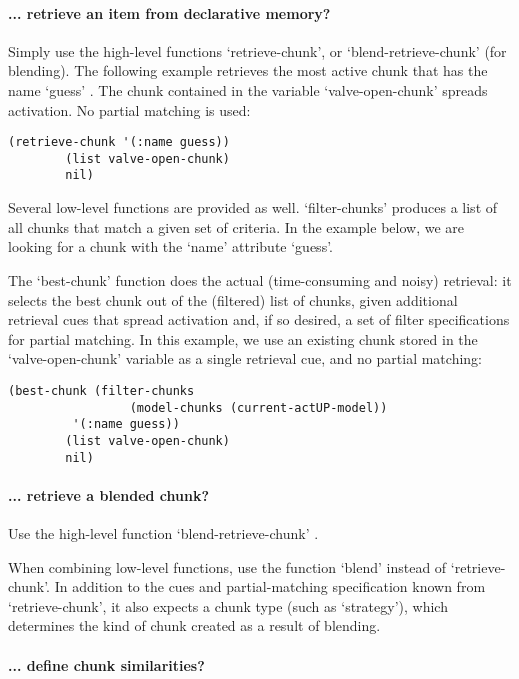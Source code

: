 \documentclass{article}
\begin{document}
\paragraph {... retrieve an item from declarative memory?}

Simply use the high-level functions `retrieve-chunk', or `blend-retrieve-chunk' (for blending).  The following example retrieves the most active chunk that has the name `guess' .  The chunk contained in the variable `valve-open-chunk' 
spreads activation.  No partial matching is used:

\begin{verbatim}
(retrieve-chunk '(:name guess))
	    (list valve-open-chunk) 
	    nil)
\end{verbatim}

Several low-level functions are provided as well.  `filter-chunks' produces a list of all chunks that match a given set of
criteria.  In the example below, we are looking for a chunk with the `name' attribute `guess'.

The `best-chunk' function does the actual (time-consuming and noisy) retrieval: it selects the best chunk out of the (filtered) list of chunks, given additional retrieval cues that spread activation and, if so desired, a set of filter specifications for partial matching.  In this example, we use an existing chunk stored in the `valve-open-chunk' variable as a single retrieval cue, and no partial matching:

\begin{verbatim}
(best-chunk (filter-chunks 
                 (model-chunks (current-actUP-model))
		 '(:name guess))
	    (list valve-open-chunk) 
	    nil)
\end{verbatim}



\paragraph {... retrieve a blended chunk?}

Use the high-level function `blend-retrieve-chunk' .

When combining low-level functions, use the function `blend' instead of `retrieve-chunk'.
In addition to the cues and partial-matching specification known from `retrieve-chunk', it also expects a chunk type (such as `strategy'), which determines the kind of chunk created as a result of blending.


\paragraph {... define chunk similarities?}
\end{document}

